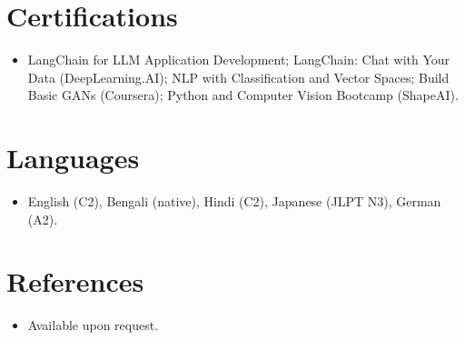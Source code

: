 \documentclass[11pt,a4paper,sans]{moderncv}
\begin{document}

\section{Certifications}
\vspace{1pt}
\begin{itemize}
\item {LangChain for LLM Application Development; LangChain: Chat with Your Data (DeepLearning.AI); NLP with Classification and Vector Spaces; Build Basic GANs (Coursera); Python and Computer Vision Bootcamp (ShapeAI).}
\end{itemize}


\section{Languages}
\vspace{1pt}
\begin{itemize}
\item {English (C2), Bengali (native), Hindi (C2), Japanese (JLPT N3), German (A2).}
\end{itemize}


\section{References}
\vspace{1pt}
\begin{itemize}
\item{Available upon request.}
\end{itemize}
\end{document}
